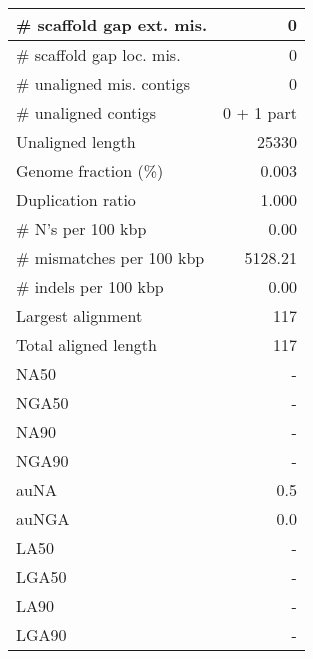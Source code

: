 \documentclass[12pt,a4paper]{article}
\begin{document}
\begin{table}[ht]
\begin{center}
\begin{tabular}{|l*{1}{|r}|}
\# scaffold gap ext. mis. & 0 \\ \hline
\# scaffold gap loc. mis. & 0 \\ \hline
\# unaligned mis. contigs & 0 \\ \hline
\# unaligned contigs & 0 + 1 part \\ \hline
Unaligned length & 25330 \\ \hline
Genome fraction (\%) & 0.003 \\ \hline
Duplication ratio & 1.000 \\ \hline
\# N's per 100 kbp & 0.00 \\ \hline
\# mismatches per 100 kbp & 5128.21 \\ \hline
\# indels per 100 kbp & 0.00 \\ \hline
Largest alignment & 117 \\ \hline
Total aligned length & 117 \\ \hline
NA50 & - \\ \hline
NGA50 & - \\ \hline
NA90 & - \\ \hline
NGA90 & - \\ \hline
auNA & 0.5 \\ \hline
auNGA & 0.0 \\ \hline
LA50 & - \\ \hline
LGA50 & - \\ \hline
LA90 & - \\ \hline
LGA90 & - \\ \hline
\end{tabular}
\end{center}
\end{table}
\end{document}
